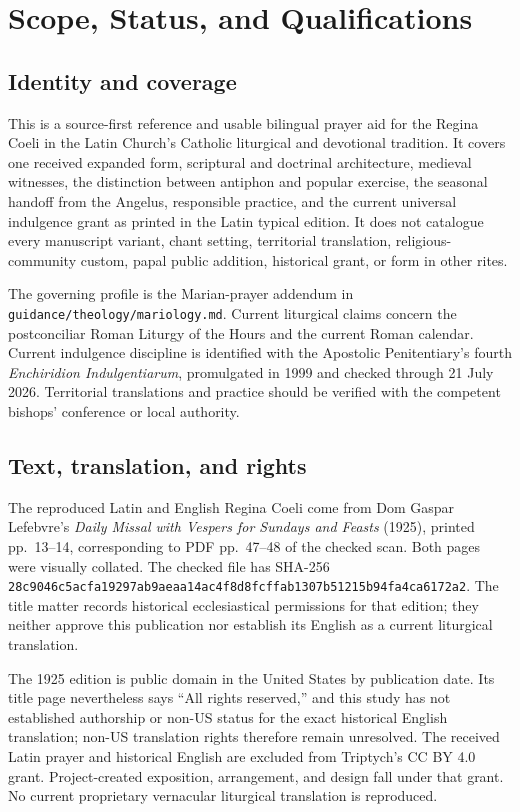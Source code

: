 \section{Scope, Status, and Qualifications}

\subsection{Identity and coverage}

This is a source-first reference and usable bilingual prayer aid for the Regina Coeli in the Latin Church's Catholic liturgical and devotional tradition. It covers one received expanded form, scriptural and doctrinal architecture, medieval witnesses, the distinction between antiphon and popular exercise, the seasonal handoff from the Angelus, responsible practice, and the current universal indulgence grant as printed in the Latin typical edition. It does not catalogue every manuscript variant, chant setting, territorial translation, religious-community custom, papal public addition, historical grant, or form in other rites.

The governing profile is the Marian-prayer addendum in \texttt{guidance/theology/mariology.md}. Current liturgical claims concern the postconciliar Roman Liturgy of the Hours and the current Roman calendar. Current indulgence discipline is identified with the Apostolic Penitentiary's fourth \textit{Enchiridion Indulgentiarum}, promulgated in 1999 and checked through 21 July 2026. Territorial translations and practice should be verified with the competent bishops' conference or local authority.

\subsection{Text, translation, and rights}

The reproduced Latin and English Regina Coeli come from Dom Gaspar Lefebvre's \textit{Daily Missal with Vespers for Sundays and Feasts} (1925), printed pp.~13--14, corresponding to PDF pp.~47--48 of the checked scan. Both pages were visually collated. The checked file has SHA-256 \texttt{28c9046c5acfa19297ab9aeaa14ac4f8d8fcffab1307b51215b94fa4ca6172a2}. The title matter records historical ecclesiastical permissions for that edition; they neither approve this publication nor establish its English as a current liturgical translation.

The 1925 edition is public domain in the United States by publication date. Its title page nevertheless says ``All rights reserved,'' and this study has not established authorship or non-US status for the exact historical English translation; non-US translation rights therefore remain unresolved. The received Latin prayer and historical English are excluded from Triptych's CC BY 4.0 grant. Project-created exposition, arrangement, and design fall under that grant. No current proprietary vernacular liturgical translation is reproduced.

